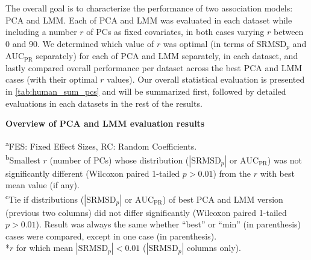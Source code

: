 \documentclass[11pt]{article}
\newcommand{\rmsd}{\text{SRMSD}_p}
\newcommand{\auc}{\text{AUC}_\text{PR}}
\begin{document}
The overall goal is to characterize the performance of two association models: PCA and LMM.
Each of PCA and LMM was evaluated in each dataset while including a number $r$ of PCs as fixed covariates, in both cases varying $r$ between 0 and 90.
We determined which value of $r$ was optimal (in terms of $\rmsd$ and $\auc$ separately) for each of PCA and LMM separately, in each dataset, and lastly compared overall performance per dataset across the best PCA and LMM cases (with their optimal $r$ values).
Our overall statistical evaluation is presented in \cref{tab:human_sum_pcs} and will be summarized first, followed by detailed evaluations in each datasets in the rest of the results.

\begin{table}[hb!]
  \centering
  \caption{
    \textbf{Overview of PCA and LMM evaluation results}
  }
  \label{tab:human_sum_pcs}
  \csvreader[
  tabular = lc|ccc|ccc,
  separator = tab,
  table head = 
  \toprule & Metric: & \multicolumn{3}{c|}{$|\rmsd|$} & \multicolumn{3}{c}{$\auc$} \\
  \midrule & & \multicolumn{2}{c}{Best (min\textsuperscript{b}) PCs} & & \multicolumn{2}{c}{Best (min\textsuperscript{b}) PCs} & \\
  Dataset & {Trait model\textsuperscript{a}} & PCA & LMM & {Best\textsuperscript{c}} & PCA & LMM & {Best\textsuperscript{c}} \\\midrule,
  late after last line = \\\bottomrule
  ]{../data/stats.txt}{}{\csvlinetotablerow}
  \begin{flushleft}
    \textsuperscript{a}FES: Fixed Effect Sizes, RC: Random Coefficients.\\
    \textsuperscript{b}Smallest $r$ (number of PCs) whose distribution ($|\rmsd|$ or $\auc$) was not significantly different (Wilcoxon paired 1-tailed $p > 0.01$) from the $r$ with best mean value (if any). \\
    \textsuperscript{c}Tie if distributions ($|\rmsd|$ or $\auc$) of best PCA and LMM version (previous two columns) did not differ significantly (Wilcoxon paired 1-tailed $p > 0.01$).
    Result was always the same whether ``best'' or ``min'' (in parenthesis) cases were compared, except in one case (in parenthesis).\\
    *$r$ for which mean $|\rmsd| < 0.01$ ($|\rmsd|$ columns only).
  \end{flushleft}
\end{table}
\end{document}
